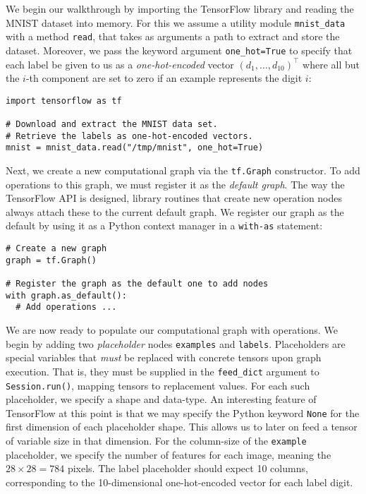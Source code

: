 We begin our walkthrough by importing the TensorFlow library and reading the
MNIST dataset into memory. For this we assume a utility module
\texttt{mnist\_data} with a method \texttt{read}, that takes as arguments a path
to extract and store the dataset. Moreover, we pass the keyword argument
\texttt{one\_hot=True} to specify that each label be given to us as a
\emph{one-hot-encoded} vector $(d_1, \dots, d_{10})^\top$ where all but the
$i$-th component are set to zero if an example represents the digit $i$:

\begin{lstlisting}
import tensorflow as tf

# Download and extract the MNIST data set.
# Retrieve the labels as one-hot-encoded vectors.
mnist = mnist_data.read("/tmp/mnist", one_hot=True)
\end{lstlisting}

Next, we create a new computational graph via the \texttt{tf.Graph}
constructor. To add operations to this graph, we must register it as the
\emph{default graph}. The way the TensorFlow API is designed, library routines
that create new operation nodes always attach these to the current default
graph. We register our graph as the default by using it as a Python context
manager in a \texttt{with-as} statement:

\begin{lstlisting}
# Create a new graph
graph = tf.Graph()

# Register the graph as the default one to add nodes
with graph.as_default():
  # Add operations ...
\end{lstlisting}

We are now ready to populate our computational graph with operations. We begin
by adding two \emph{placeholder} nodes \texttt{examples} and
\texttt{labels}. Placeholders are special variables that \emph{must} be replaced
with concrete tensors upon graph execution. That is, they must be supplied in
the \texttt{feed\_dict} argument to \texttt{Session.run()}, mapping tensors to
replacement values. For each such placeholder, we specify a shape and
data-type. An interesting feature of TensorFlow at this point is that we may
specify the Python keyword \texttt{None} for the first dimension of each
placeholder shape. This allows us to later on feed a tensor of variable size in
that dimension. For the column-size of the \texttt{example} placeholder, we
specify the number of features for each image, meaning the $28 \times 28 = 784$
pixels. The label placeholder should expect 10 columns, corresponding to the
10-dimensional one-hot-encoded vector for each label digit.

